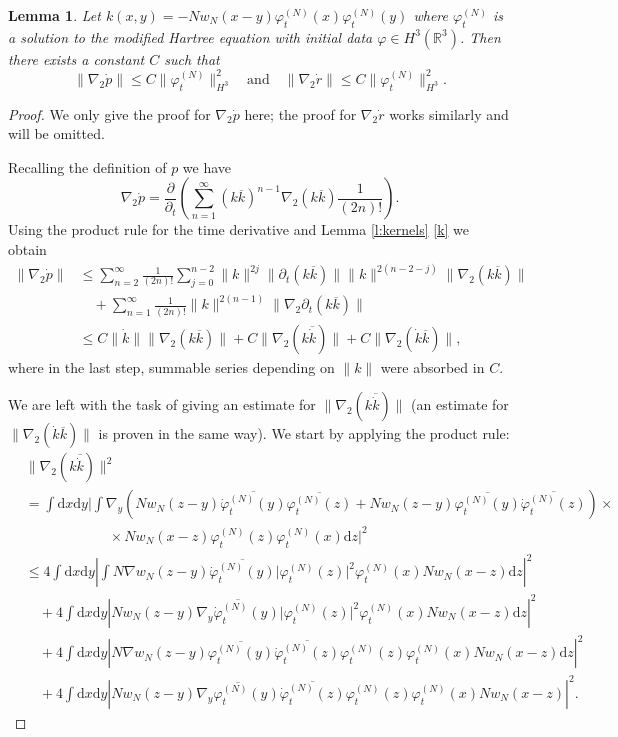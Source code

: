 \documentclass[11pt,a4paper,DIV11]{scrartcl}	%
\newtheorem{lem}[thm]{Lemma}
\newcommand{\di}{\textrm{d}}		%
\newcommand{\cc}[1]{\overline{#1}}	%
\newcommand{\Rbb}{\mathbb{R}}		%
\newcommand{\norm}[1]{\lVert#1\rVert}	%
\newcommand{\ph}{\varphi_t^{(N)}}	%
\newcommand{\phdot}{\dot{\varphi}_t^{(N)}}	%
\newcommand{\gradone}{\nabla_2}
\newcommand{\bd}{\begin{displaymath}}			%
\newcommand{\ed}{\end{displaymath}}
\begin{document}
\begin{lem}
\label{lem:dottedests3}
Let $k(x,y) = -N w_N(x-y) \ph(x)\ph(y)$ where $\ph$ is a solution to the modified Hartree equation with initial data $\varphi \in H^3(\Rbb^3)$. Then there exists a constant $C$ such that
\bd
\norm{\gradone \dot p} \leq C \norm{\ph}_{H^3}^2 \quad \mbox{and} \quad \norm{\gradone \dot r} \leq C \norm{\ph}_{H^3}^2.
\ed
\end{lem}
\begin{proof}
We only give the proof for $\gradone \dot p$ here; the proof for $\gradone \dot r$ works similarly and will be omitted.

Recalling the definition of $p$ we have
\bd
\gradone \dot p = \frac{\partial}{\partial_t} \left( \sum_{n=1}^\infty (k \cc k)^{n-1} \gradone(k \cc k) \frac{1}{(2n)!} \right).
\ed
Using the product rule for the time derivative and Lemma \ref{l:kernels} \ref{k} we obtain
\begin{align*}
\norm{\gradone \dot p} & \leq \sum_{n=2}^\infty \frac{1}{(2n)!} \sum_{j=0}^{n-2} \norm{k}^{2j} \norm{\partial_t(k \cc k)} \norm{k}^{2(n-2-j)} \norm{\gradone (k \cc k)} \\
& \quad + \sum_{n=1}^\infty \frac{1}{(2n)!} \norm{k}^{2(n-1)} \norm{\gradone \partial_t (k \cc k)} \\
& \leq C \norm{\dot k} \norm{\gradone(k \cc k)} + C \norm{\gradone(k \cc{\dot k})} + C \norm{\gradone (\dot k \cc k)},
\end{align*}
where in the last step, summable series depending on $\norm{k}$ were absorbed in $C$.

We are left with the task of giving an estimate for $\norm{\gradone(k \cc{\dot k})}$ (an estimate for $\norm{\gradone (\dot k \cc k)}$ is proven in the same way). We start by applying the product rule:
\begin{align}
& \norm{\gradone(k \cc{\dot k})}^2 \nonumber \\
& = \int \di x \di y \bigg\lvert \int \nabla_y\left( N w_N(z-y) \cc{\phdot(y)} \cc{\ph(z)} + N w_N(z-y) \cc{\ph(y)} \cc{\phdot(z)} \right) \times \nonumber \\
& \qquad\qquad\qquad \times N w_N(x-z) {\ph(z)} {\ph(x)} \di z \bigg\rvert^2 \nonumber \\
& \leq 4 \int \di x \di y \left\lvert \int N \nabla w_N(z-y) \cc{\phdot(y)} \lvert\ph(z)\rvert^2 {\ph(x)} N w_N(x-z) \di z \right\rvert^2 \label{eq:kk1} \\
& \quad + 4 \int \di x \di y \left\lvert N w_N(z-y) \cc{\nabla_y \phdot(y)} \lvert \ph(z)\rvert^2 {\ph(x)} N w_N(x-z) \di z \right\rvert^2 \label{eq:kk2}\\
& \quad + 4 \int \di x \di y \left\lvert N \nabla w_N(z-y) \cc{\ph(y)} \cc{\phdot(z)} {\ph(z)} {\ph(x)} N w_N(x-z) \di z \right\rvert^2 \label{eq:kk3}\\
& \quad + 4 \int \di x \di y \left\lvert N w_N(z-y) \cc{\nabla_y \ph(y)} \cc{\phdot(z)} {\ph(z)} {\ph(x)} N w_N(x-z) \right\rvert^2. \label{eq:kk4}
\end{align}


\end{proof}
\end{document}
